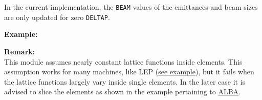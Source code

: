 In the current implementation, the {\tt BEAM} values of the emittances and
beam sizes are only updated for zero {\tt DELTAP}.  

{\bf Example:}

{\bf Remark:}\\
This module assumes nearly constant lattice functions
inside elements. This assumption works for many machines, like LEP
(\href{http://cern.ch/frs/mad-X_examples/emit/LEP/}{see example}), but
it fails when the lattice functions largely vary inside single
elements. In the later case it is advised to slice the elements as shown
in the example pertaining to
\href{http://cern.ch/frs/mad-X_examples/emit/ALBA/}{ALBA}.     


